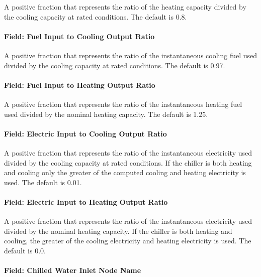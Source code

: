 A positive fraction that represents the ratio of the heating capacity divided by the cooling capacity at rated conditions. The default is 0.8.

\paragraph{Field: Fuel Input to Cooling Output Ratio}\label{field-fuel-input-to-cooling-output-ratio}

A positive fraction that represents the ratio of the instantaneous cooling fuel used divided by the cooling capacity at rated conditions. The default is 0.97.

\paragraph{Field: Fuel Input to Heating Output Ratio}\label{field-fuel-input-to-heating-output-ratio}

A positive fraction that represents the ratio of the instantaneous heating fuel used divided by the nominal heating capacity. The default is 1.25.

\paragraph{Field: Electric Input to Cooling Output Ratio}\label{field-electric-input-to-cooling-output-ratio}

A positive fraction that represents the ratio of the instantaneous electricity used divided by the cooling capacity at rated conditions. If the chiller is both heating and cooling only the greater of the computed cooling and heating electricity is used. The default is 0.01.

\paragraph{Field: Electric Input to Heating Output Ratio}\label{field-electric-input-to-heating-output-ratio}

A positive fraction that represents the ratio of the instantaneous electricity used divided by the nominal heating capacity. If the chiller is both heating and cooling, the greater of the cooling electricity and heating electricity is used. The default is 0.0.

\paragraph{Field: Chilled Water Inlet Node Name}\label{field-chilled-water-inlet-node-name-7}

